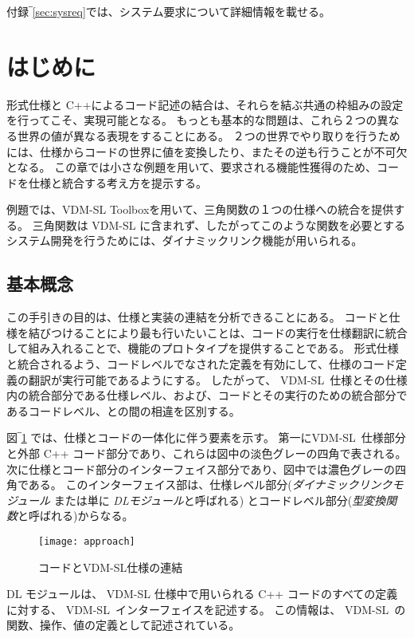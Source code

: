 \documentclass[\pformat,12pt]{jarticle}
\newcommand{\vdmslpp}{VDM-SL}
\begin{document}
付録‾\ref{sec:sysreq}では、システム要求について詳細情報を載せる。


\section{はじめに}
\label{getting-started}

形式仕様と C++によるコード記述の結合は、それらを結ぶ共通の枠組みの設定を行ってこそ、実現可能となる。
もっとも基本的な問題は、これら２つの異なる世界の値が異なる表現をすることにある。
２つの世界でやり取りを行うためには、仕様からコードの世界に値を変換したり、またその逆も行うことが不可欠となる。
この章では小さな例題を用いて、要求される機能性獲得のため、コードを仕様と統合する考え方を提示する。

例題では、VDM-SL Toolboxを用いて、三角関数の１つの仕様への統合を提供する。 
三角関数は VDM-SL に含まれず、したがってこのような関数を必要とするシステム開発を行うためには、ダイナミックリンク機能が用いられる。

\subsection{基本概念}

この手引きの目的は、仕様と実装の連結を分析できることにある。 
コードと仕様を結びつけることにより最も行いたいことは、コードの実行を仕様翻訳に統合して組み入れることで、機能のプロトタイプを提供することである。
形式仕様と統合されるよう、コードレベルでなされた定義を有効にして、仕様のコード定義の翻訳が実行可能であるようにする。
したがって、 \vdmslpp\ 仕様とその仕様内の統合部分である仕様レベル、および、コードとその実行のための統合部分であるコードレベル、との間の相違を区別する。

図‾\ref{idea} では、仕様とコードの一体化に伴う要素を示す。
第一に\vdmslpp\ 仕様部分と外部 C++ コード部分であり、これらは図中の淡色グレーの四角で表される。
次に仕様とコード部分のインターフェイス部分であり、図中では濃色グレーの四角である。 
このインターフェイス部は、仕様レベル部分({\em ダイナミックリンクモジュール\/} または単に {\em DLモジュール\/}と呼ばれる) とコードレベル部分({\em 型変換関数\/}と呼ばれる)からなる。

 
\begin{figure}
\begin{center}
\resizebox{.55\textwidth}{!}%
{\texttt{[image: approach]}}
\caption{コードとVDM-SL仕様の連結\label{idea}}
\end{center}
\end{figure}

DL モジュールは、 VDM-SL 仕様中で用いられる C++ コードのすべての定義に対する、 \vdmslpp\ インターフェイスを記述する。
この情報は、 \vdmslpp\ の関数、操作、値の定義として記述されている。
\end{document}
